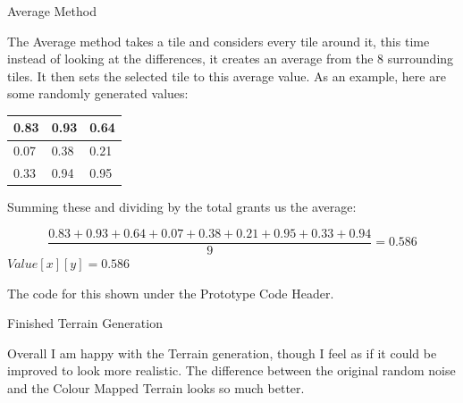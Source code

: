 \begin{flushleft}
\begin{enumerate}
            {\large Average Method}
            \vspace{0.25cm}

            The Average method takes a tile and considers every tile around it, this time instead of looking at the
            differences, it creates an average from the 8 surrounding tiles. It then sets the selected tile to this
            average value. As an example, here are some randomly generated values:

            \begin{center}
                \begin{tabular}{| M{0.75cm} | M{0.75cm} | M{0.75cm} |}
                     & 0.93 & 0.64 \\ [0.75cm]
                     & 0.38 & 0.21 \\ [0.75cm]
                     & 0.94 & 0.95 \\ [0.75cm]
                    \hline
                \end{tabular}
                \vspace{0.25cm}

                Summing these and dividing by the total grants us the average:

                \[
                \frac{0.83 + 0.93 + 0.64 + 0.07 + 0.38 + 0.21 + 0.95 + 0.33 + 0.94}{9} = 0.586
                \]
                $Value[x][y] = 0.586$
            \end{center}
            \vspace{0.25cm}

            The code for this shown under the Prototype Code Header.

            \vspace{1cm}

            {\large Finished Terrain Generation} \\
            \vspace{0.25cm}

            Overall I am happy with the Terrain generation, though I feel as if it could be improved to look more realistic.
            The difference between the original random noise and the Colour Mapped Terrain looks so much better.


\end{enumerate}
\end{flushleft}
